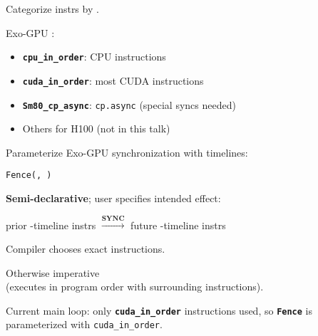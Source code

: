 \begin{center}
\Large
\begin{tikzpicture}[node distance=0mm]

\end{tikzpicture}
\end{center}

\newpage
{}

{\LARGE
Categorize instrs by .

Exo-GPU :
\begin{itemize}
  \item \textbf{\texttt{cpu\_in\_order}}: CPU instructions
  \item \textbf{\texttt{cuda\_in\_order}}: most CUDA instructions
  \item \textbf{\texttt{Sm80\_cp\_async}}: \texttt{cp.async} (special syncs needed)
  \item Others for H100 (not in this talk)
\end{itemize}

}

\newpage
{}

{\LARGE
Parameterize Exo-GPU synchronization with timelines:

\begin{center}
  \texttt{Fence(, )}
\end{center}

\textbf{Semi-declarative}; user specifies intended effect:

\begin{center}
prior -timeline instrs $\xrightarrow{\textbf{SYNC}}$ future -timeline instrs
\end{center}

Compiler chooses exact instructions.

Otherwise imperative\\(executes in program order with surrounding instructions).

}

\newpage
{}

{\large

}

{\LARGE
Current main loop:
only \textbf{\texttt{cuda\_in\_order}} instructions used,
so \textbf{\texttt{Fence}} is parameterized with \texttt{cuda\_in\_order}.
}

\newpage
{}

